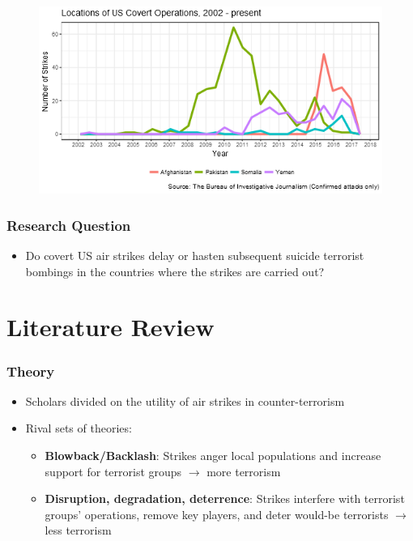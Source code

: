 \documentclass{beamer}
\begin{document}
  \begin{frame}
	\begin{figure}[h!]
		\includegraphics[width=\linewidth]{combined_strikes.png}
	\end{figure}
  \end{frame}

  \begin{frame}
    \frametitle{Research Question}
    \begin{itemize}
      \item Do covert US air strikes delay or hasten subsequent suicide terrorist bombings in the countries where the strikes are carried out?
    \end{itemize}
  \end{frame}

\section{Literature Review}

  \begin{frame}
    \frametitle{Theory}
    \begin{itemize}
       \item Scholars divided on the utility of air strikes in counter-terrorism
	\item Rival sets of theories:
		\begin{itemize}
			\item \textbf{Blowback/Backlash}: Strikes anger local populations and increase support for terrorist groups $\rightarrow$ more terrorism
			\item \textbf{Disruption, degradation, deterrence}: Strikes interfere with terrorist groups' operations, remove key players, and deter would-be terrorists $\rightarrow$ less terrorism
		\end{itemize}
\end{itemize}
  \end{frame}
\end{document}
